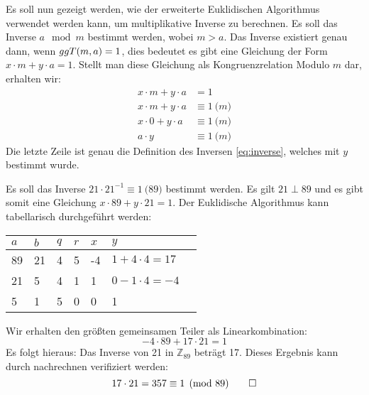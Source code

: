 \noindent
Es soll nun gezeigt werden, wie der erweiterte Euklidischen Algorithmus verwendet werden kann,
um multiplikative Inverse zu berechnen. Es soll das Inverse $a \mod{m}$ bestimmt werden, wobei
$m > a$. Das Inverse existiert genau dann, wenn $ggT(m,a) = 1$, dies bedeutet es gibt
eine Gleichung der Form $x \cdot m + y \cdot a = 1$. Stellt man diese Gleichung
als Kongruenzrelation Modulo $m$ dar, erhalten wir:
\begin{align*}
  x \cdot m + y \cdot a & = 1              \\
  x \cdot m + y \cdot a & \equiv 1 \pod{m} \\
  x \cdot 0 + y \cdot a & \equiv 1 \pod{m} \\
  a \cdot y             & \equiv 1 \pod{m}
\end{align*}
Die letzte Zeile ist genau die Definition des Inversen \eqref{eq:inverse}, welches
mit $y$ bestimmt wurde.
\begin{example}
  Es soll das Inverse $21 \cdot 21^{-1} \equiv 1 \pod{89}$ bestimmt werden.
  Es gilt $21 \perp 89$ und es gibt somit eine Gleichung
  $x \cdot 89 + y \cdot 21 = 1$. Der Euklidische
  Algorithmus kann tabellarisch durchgeführt werden:
  \begin{center}
    \centering
    \begin{tabular}{|l|l|l|l|l|l|l|}
      \hline
      $a$ & $b$ & $q$ & $r$ & $x$ & $y$                  \\ \hline
      89  & 21  & 4   & 5   & -4  & $1 + 4 \cdot 4 = 17$ \\ \hline
      21  & 5   & 4   & 1   & 1   & $0 - 1 \cdot 4 = -4$ \\ \hline
      5   & 1   & 5   & 0   & 0   & 1                    \\ \hline
    \end{tabular}
  \end{center}
  \noindent
  Wir erhalten den größten gemeinsamen Teiler als Linearkombination:
  \begin{equation*}
    -4 \cdot 89 + 17 \cdot 21 = 1
  \end{equation*}
  Es folgt hieraus: Das Inverse von 21 in $\mathbb{Z}_{89}$ beträgt 17. Dieses Ergebnis kann durch nachrechnen
  verifiziert werden:
  \begin{equation*}
    17 \cdot 21 = 357 \equiv 1 \pmod{89} \qedhere
  \end{equation*}
\end{example}

